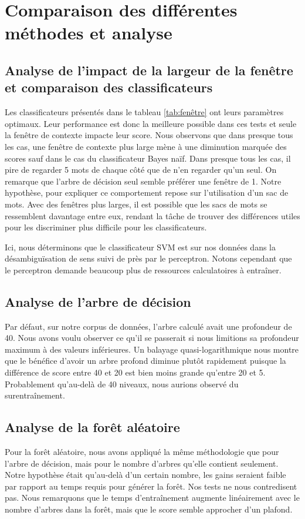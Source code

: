 \documentclass[11pt]{rapport-tp-ia}
\begin{document}
\vspace{3em}
\newpage  %
\chapter{Comparaison des différentes méthodes et analyse}

\section{Analyse de l'impact de la largeur de la fenêtre et comparaison des classificateurs}
Les classificateurs présentés dans le tableau \ref{tab:fenêtre} ont leurs paramètres optimaux.
Leur performance est donc la meilleure possible dans ces tests et seule la fenêtre de contexte impacte leur score.
Nous observons que dans presque tous les cas, une fenêtre de contexte plus large mène à une diminution marquée des scores sauf dans le cas du classificateur Bayes naïf.
Dans presque tous les cas, il pire de regarder 5 mots de chaque côté que de n'en regarder qu'un seul.
On remarque que l'arbre de décision seul semble préférer une fenêtre de 1.
Notre hypothèse, pour expliquer ce comportement repose sur l'utilisation d'un sac de mots.
Avec des fenêtres plus larges, il est possible que les sacs de mots se ressemblent davantage entre eux, rendant la tâche de trouver des différences utiles pour les discriminer plus difficile pour les classificateurs.


Ici, nous déterminons que le classificateur SVM est sur nos données dans la désambiguïsation de sens suivi de près par le perceptron.
Notons cependant que le perceptron demande beaucoup plus de ressources calculatoires à entraîner.

\section{Analyse de l'arbre de décision}
Par défaut, sur notre corpus de données, l'arbre calculé avait une profondeur de 40.
Nous avons voulu observer ce qu'il se passerait si nous limitions sa profondeur maximum à des valeurs inférieures.
Un balayage quasi-logarithmique nous montre que le bénéfice d'avoir un arbre profond diminue plutôt rapidement puisque la différence de score entre 40 et 20 est bien moins grande qu'entre 20 et 5.
Probablement qu'au-delà de 40 niveaux, nous aurions observé du surentraînement.

\section{Analyse de la forêt aléatoire}
Pour la forêt aléatoire, nous avons appliqué la même méthodologie que pour l'arbre de décision, mais pour le nombre d'arbres qu'elle contient seulement.
Notre hypothèse était qu'au-delà d'un certain nombre, les gains seraient faible par rapport au temps requis pour générer la forêt.
Nos tests ne nous contredisent pas.
Nous remarquons que le temps d'entraînement augmente linéairement avec le nombre d'arbres dans la forêt, mais que le score semble approcher d'un plafond.
\end{document}
